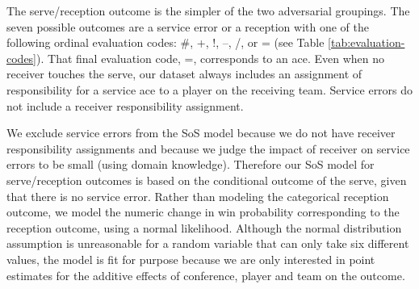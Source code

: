 \documentclass[USenglish]{article}
\theoremstyle{dgthm}
\theoremstyle{dgdef}
\begin{document}
The serve/reception outcome is the simpler of the two adversarial groupings. The seven possible outcomes are a service error or a reception with one of the following ordinal evaluation codes: \#, +, !, --, /, or = (see Table \ref{tab:evaluation-codes}). That final evaluation code, =, corresponds to an ace. Even when no receiver touches the serve, our dataset always includes an assignment of responsibility for a service ace to a player on the receiving team. Service errors do not include a receiver responsibility assignment.

We exclude service errors from the SoS model because we do not have receiver responsibility assignments and because we judge the impact of receiver on service errors to be small (using domain knowledge). Therefore our SoS model for serve/reception outcomes is based on the conditional outcome of the serve, given that there is no service error. Rather than modeling the categorical reception outcome, we model the numeric change in win probability corresponding to the reception outcome, using a normal likelihood. Although the normal distribution assumption is unreasonable for a random variable that can only take six different values, the model is fit for purpose because we are only interested in point estimates for the additive effects of conference, player and team on the outcome.
\end{document}
